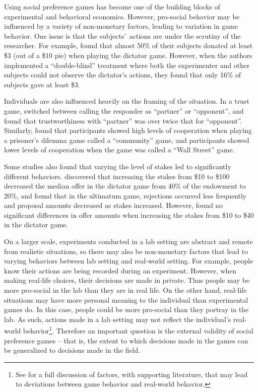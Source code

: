 \documentclass[12pt]{article}
\begin{document}
Using social preference games has become one of the building blocks of experimental and behavioral economics. However, pro-social behavior may be influenced by a variety of non-monetary factors, leading to variation in game behavior. One issue is that the subjects\rq \ actions are under the scrutiny of the researcher. For example, \cite{hoffman_1994} found that almost 50\% of their subjects donated at least \$3 (out of a \$10 pie) when playing the dictator game. However, when the authors implemented a ``double-blind'' treatment where both the experimenter and other subjects could not observe the dictator\rq s actions, they found that only 16\% of subjects gave at least \$3.

Individuals are also influenced heavily on the framing of the situation. In a trust game, \cite{burnham_mccabe_smith_2000} switched between calling the responder as ``partner'' or ``opponent'', and found that trustworthiness with ``partner'' was over twice that for ``opponent''. Similarly, \cite{ross_ward_1996} found that participants showed high levels of cooperation when playing a prisoner\rq s dilemma game called a ``community'' game, and participants showed lower levels of cooperation when the game was called a ``Wall Street'' game. 

Some studies also found that varying the level of stakes led to significantly different behaviors. \cite{carpenter_verhoogen_burks_2005} discovered that increasing the stakes from \$10 to \$100 decreased the median offer in the dictator game from 40\% of the endowment to 20\%, and \cite{slonim_roth_1998} found that in the ultimatum game, rejections occurred less frequently and proposal amounts decreased as stakes increased. However, \cite{cherry_frykblom_shogren_2002} found no significant differences in offer amounts when increasing the stakes from \$10 to \$40 in the dictator game. 

On a larger scale, experiments conducted in a lab setting are abstract and remote from realistic situations, so there may also be non-monetary factors that lead to varying behaviors between lab setting and real-world setting. For example, people know their actions are being recorded during an experiment. However, when making real-life choices, their decisions are made in private. Thus people may be more pro-social in the lab than they are in real life. On the other hand, real-life situations may have more personal meaning to the individual than experimental games do. In this case, people could be more pro-social than they portray in the lab. As such, actions made in a lab setting may not reflect the individual\rq s real-world behavior\footnote{See \cite{levitt_list_2007} for a full discussion of factors, with supporting literature, that may lead to deviations between game behavior and real-world behavior.}. Therefore an important question is the external validity of social preference games -- that is, the extent to which decisions made in the games can be generalized to decisions made in the field.
\end{document}
